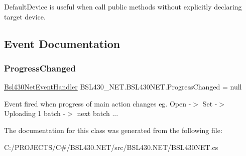 Default\+Device is useful when call public methods without explicitly declaring target device. 



\subsection{Event Documentation}
\mbox{\label{class_b_s_l430___n_e_t_1_1_b_s_l430_n_e_t_aab78a2fd8dcb209a9e5caf001f992ef3}} 
\subsubsection{\texorpdfstring{ProgressChanged}{ProgressChanged}}
{\footnotesize\ttfamily \mbox{\hyperlink{namespace_b_s_l430___n_e_t_a98dbd2acd09405042ee92547353c9f81}{Bsl430\+Net\+Event\+Handler}} B\+S\+L430\+\_\+\+N\+E\+T.\+B\+S\+L430\+N\+E\+T.\+Progress\+Changed = null}



Event fired when progress of main action changes eg. Open -\/$>$ Set -\/$>$ Uploading 1 batch -\/$>$ next batch ... 



The documentation for this class was generated from the following file\+:\begin{DoxyCompactItemize}
\item 
C\+:/\+P\+R\+O\+J\+E\+C\+T\+S/\+C\#/\+B\+S\+L430.\+N\+E\+T/src/\+B\+S\+L430.\+N\+E\+T/B\+S\+L430\+N\+E\+T.\+cs\end{DoxyCompactItemize}
